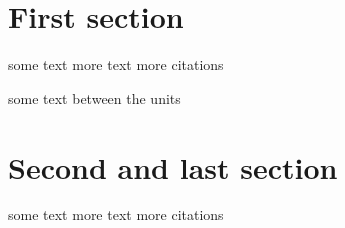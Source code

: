 \documentclass{article}
\begin{document}
\bibliographyunit[\section]
\section{First section}
some text \cite{Lamport:1994} more text more citations
\putbib[lit]

some text between the units
\section{Second and last section}
some text \cite*{Knuth:1991} more text more citations
\putbib[lit]



\end{document}
